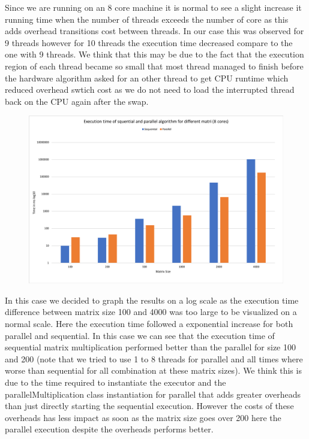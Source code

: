 \documentclass[11pt,letterpaper]{exam}
\begin{document}
\begin{questions}
			\quad Since we are running on an 8 core machine it is normal to see a slight increase it running time when the number of threads exceeds the number of core as this adds overhead transitions cost between threads. In our case this was observed for 9 threads however for 10 threads the execution time decreased compare to the one with 9 threads. We think that this may be due to the fact that the execution region of each thread became so small that most thread managed to finish before the hardware algorithm asked for an other thread to get CPU runtime which reduced overhead swtich cost as we do not need to load the interrupted thread back on the CPU again after the swap.			
			\begin{figure}[h!]
				\centering
				\includegraphics[scale=0.5]{ExectionParallelSequential}
			\end{figure}
			In this case we decided to graph the results on a log scale as the execution time difference between matrix size 100 and 4000 was too large to be visualized on a normal scale. Here the execution time followed a exponential increase for both parallel and sequential. In this case we can see that the execution time of sequential matrix multiplication performed better than the parallel for size 100 and 200 (note that we tried to use 1 to 8 threads for parallel and all times where worse than sequential for all combination at these matrix sizes). We think this is due to the time required to instantiate the executor and the parallelMultiplication class instantiation for parallel that adds greater overheads than just directly starting the sequential execution. However the costs of these overheads has less impact as soon as the matrix size goes over 200 here the parallel execution despite the overheads performs better.

\end{questions}
\end{document}
